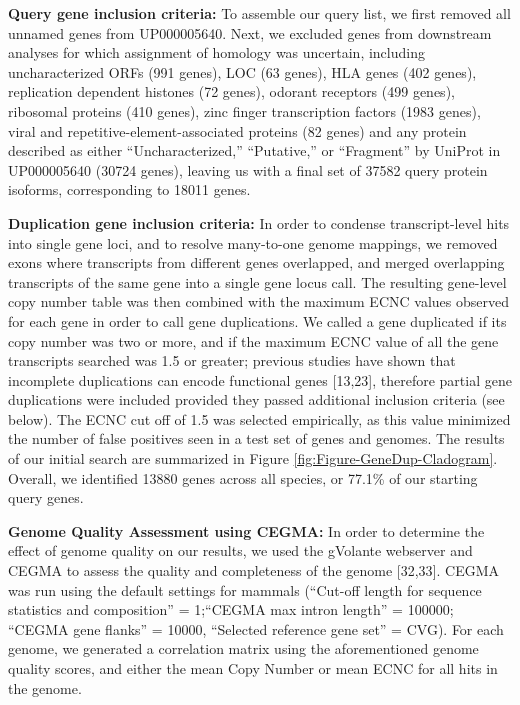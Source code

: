 \documentclass[]{elsarticle} %
\begin{document}
\textbf{Query gene inclusion criteria:} To assemble our query list, we first removed all unnamed genes from UP000005640. Next, we excluded genes from downstream analyses for which assignment of homology was uncertain, including uncharacterized ORFs (991 genes), LOC (63 genes), HLA genes (402 genes), replication dependent histones (72 genes), odorant receptors (499 genes), ribosomal proteins (410 genes), zinc finger transcription factors (1983 genes), viral and repetitive-element-associated proteins (82 genes) and any protein described as either ``Uncharacterized,'' ``Putative,'' or ``Fragment'' by UniProt in UP000005640 (30724 genes), leaving us with a final set of 37582 query protein isoforms, corresponding to 18011 genes.

\textbf{Duplication gene inclusion criteria:} In order to condense transcript-level hits into single gene loci, and to resolve many-to-one genome mappings, we removed exons where transcripts from different genes overlapped, and merged overlapping transcripts of the same gene into a single gene locus call. The resulting gene-level copy number table was then combined with the maximum ECNC values observed for each gene in order to call gene duplications. We called a gene duplicated if its copy number was two or more, and if the maximum ECNC value of all the gene transcripts searched was 1.5 or greater; previous studies have shown that incomplete duplications can encode functional genes {[}13,23{]}, therefore partial gene duplications were included provided they passed additional inclusion criteria (see below). The ECNC cut off of 1.5 was selected empirically, as this value minimized the number of false positives seen in a test set of genes and genomes. The results of our initial search are summarized in Figure \ref{fig:Figure-GeneDup-Cladogram}. Overall, we identified 13880 genes across all species, or 77.1\% of our starting query genes.

\textbf{Genome Quality Assessment using CEGMA:} In order to determine the effect of genome quality on our results, we used the gVolante webserver and CEGMA to assess the quality and completeness of the genome {[}32,33{]}. CEGMA was run using the default settings for mammals (``Cut-off length for sequence statistics and composition'' = 1;``CEGMA max intron length'' = 100000; ``CEGMA gene flanks'' = 10000, ``Selected reference gene set'' = CVG). For each genome, we generated a correlation matrix using the aforementioned genome quality scores, and either the mean Copy Number or mean ECNC for all hits in the genome.
\end{document}
